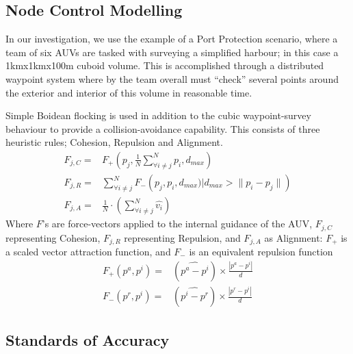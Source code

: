\documentclass[conference,compsoc,letterpaper]{IEEEtran}
\begin{document}
\subsection{Node Control Modelling}

In our investigation, we use the example of a Port Protection scenario, where a team of six AUVs are tasked with surveying a simplified harbour; in this case a 1kmx1kmx100m cuboid volume.
This is accomplished through a distributed waypoint system where by the team overall must ``check'' several points around the exterior and interior of this volume in reasonable time.

Simple Boidean flocking \cite{Reynolds1987a} is used in addition to the cubic waypoint-survey behaviour to provide a collision-avoidance capability.
This consists of three heuristic rules; Cohesion, Repulsion and Alignment.
\begin{align}
  F_{j,C}=& F_+\left(p_j, \frac{1}{N}\sum\limits_{\forall i \ne j}^N{p_i}, d_{max}\right)\label{eq:fa}\\
  F_{j,R}=& \sum\limits_{\forall i \ne j}^N F_-\left(p_j, p_i, d_{max}) \big| d_{max}>\|p_i-p_j\|\right)\label{eq:fr}\\
  F_{j,A}=& \frac{1}{N}\cdot\left(\sum\limits_{\forall i \ne j}^N \hat{v_i}\right)\label{eq:fc}
\end{align}
Where $F$'s are force-vectors applied to the internal guidance of the AUV, $F_{j,C}$ representing Cohesion, $F_{j,R}$ representing Repulsion, and $F_{j,A}$ as Alignment: $F_+$ is a scaled vector attraction function, and $F_-$ is an equivalent repulsion function
\begin{align}
  F_+(p^a, p^i)=&(\widehat{p^a-p^i}) \times \frac{|p^a-p^i|}{d}\\
  F_-(p^r, p^i)=&(\widehat{p^i-p^r}) \times \frac{|p^r-p^i|}{d}
\end{align}



\subsection{Standards of Accuracy}\label{sec:standards}
\end{document}
